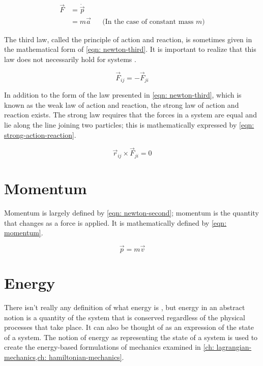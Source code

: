 \documentclass[main.tex]{subfiles}
\begin{document}
\begin{align} \label{eqn: newton-second}
\vec{F} &= \dot{\vec{p}}  && \\
&= m \vec{a} &&\text{(In the case of constant mass $m$)}
\end{align}

The third law, called the principle of action and reaction, is sometimes given in the
mathematical form of \cref{eqn: newton-third}. It is important to realize that this
law does not necessarily hold for systems \cite{goldstein_cm}.

\begin{equation} \label{eqn: newton-third}
\vec{F}_{ij} = -\vec{F}_{ji}
\end{equation}

In addition to the form of the law presented in \cref{eqn: newton-third}, which is known
as the weak law of action and reaction, the strong law of action and reaction exists. The
strong law requires that the forces in a system are equal and lie along the line joining
two particles; this is mathematically expressed by \cref{eqn: strong-action-reaction}.

\begin{equation} \label{eqn: strong-action-reaction}
\vec{r}_{ij} \times \vec{F}_{ji} = 0
\end{equation}

\section{Momentum}

Momentum is largely defined by \cref{eqn: newton-second}; momentum is the quantity
that changes as a force is applied. It is mathematically defined by \cref{eqn: momentum}.

\begin{equation} \label{eqn: momentum}
\vec{p} = m \vec{v}
\end{equation}

\section{Energy}

There isn't really any definition of what energy is \cite{feynman_vol1}, but energy in
an abstract notion is a quantity of the system that is conserved regardless of the
physical processes that take place. It can also be thought of as an expression of the
state of a system. The notion of energy as representing the state of a system is used
to create the energy-based formulations of mechanics examined in
\cref{ch: lagrangian-mechanics,ch: hamiltonian-mechanics}.
\end{document}

